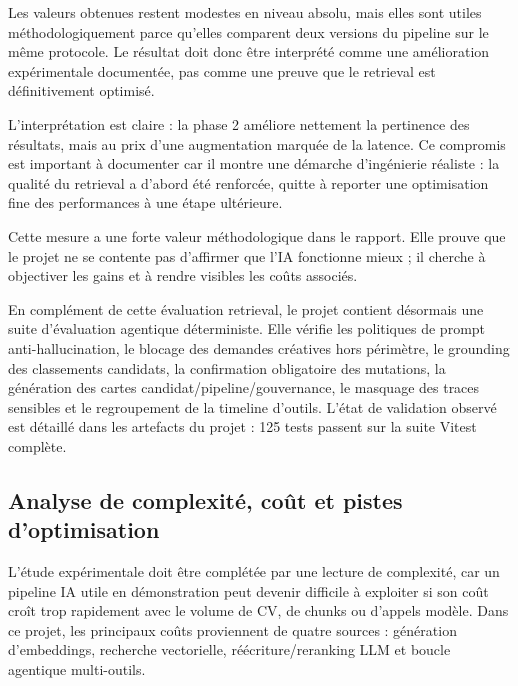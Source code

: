 Les valeurs obtenues restent modestes en niveau absolu, mais elles sont utiles méthodologiquement parce qu'elles comparent deux versions du pipeline sur le même protocole. Le résultat doit donc être interprété comme une amélioration expérimentale documentée, pas comme une preuve que le retrieval est définitivement optimisé.

L'interprétation est claire : la phase 2 améliore nettement la pertinence des résultats, mais au prix d'une augmentation marquée de la latence. Ce compromis est important à documenter car il montre une démarche d'ingénierie réaliste : la qualité du retrieval a d'abord été renforcée, quitte à reporter une optimisation fine des performances à une étape ultérieure.

Cette mesure a une forte valeur méthodologique dans le rapport. Elle prouve que le projet ne se contente pas d'affirmer que l'IA fonctionne mieux ; il cherche à objectiver les gains et à rendre visibles les coûts associés.

En complément de cette évaluation retrieval, le projet contient désormais une suite d'évaluation agentique déterministe. Elle vérifie les politiques de prompt anti-hallucination, le blocage des demandes créatives hors périmètre, le grounding des classements candidats, la confirmation obligatoire des mutations, la génération des cartes candidat/pipeline/gouvernance, le masquage des traces sensibles et le regroupement de la timeline d'outils. L'état de validation observé est détaillé dans les artefacts du projet : 125 tests passent sur la suite Vitest complète.

\subsection{Analyse de complexité, coût et pistes d'optimisation}
L'étude expérimentale doit être complétée par une lecture de complexité, car un pipeline IA utile en démonstration peut devenir difficile à exploiter si son coût croît trop rapidement avec le volume de CV, de chunks ou d'appels modèle. Dans ce projet, les principaux coûts proviennent de quatre sources : génération d'embeddings, recherche vectorielle, réécriture/reranking LLM et boucle agentique multi-outils.

